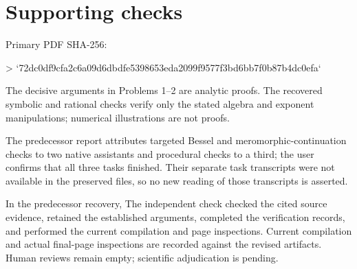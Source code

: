 \documentclass[10pt]{article}
\begin{document}
\section*{Supporting checks}
Primary PDF SHA-256:\par
> `72dc0df9cfa2c6a09d6dbdfe5398653eda2099f9577f3bd6bb7f0b87b4dc0efa`\par
The decisive arguments in Problems 1–2 are analytic proofs. The recovered symbolic and rational checks verify only the stated algebra and exponent manipulations; numerical illustrations are not proofs.\par
The predecessor report attributes targeted Bessel and meromorphic-continuation checks to two native assistants and procedural checks to a third; the user confirms that all three tasks finished. Their separate task transcripts were not available in the preserved files, so no new reading of those transcripts is asserted.\par
In the predecessor recovery, The independent check checked the cited source evidence, retained the established arguments, completed the verification records, and performed the current compilation and page inspections. Current compilation and actual final-page inspections are recorded against the revised artifacts. Human reviews remain empty; scientific adjudication is pending.\par
\end{document}
